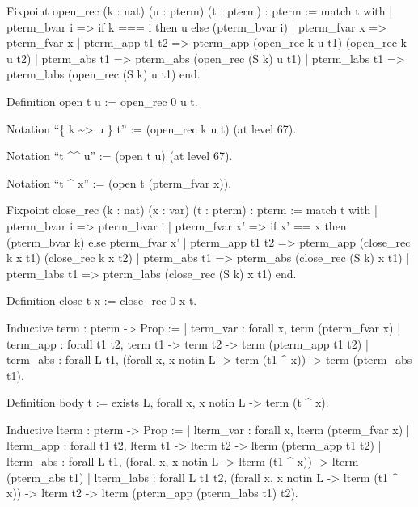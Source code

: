 Fixpoint open\_rec (k : nat) (u : pterm) (t : pterm) : pterm :=
  match t with
  | pterm\_bvar i    => if k === i then u else (pterm\_bvar i)
  | pterm\_fvar x    => pterm\_fvar x
  | pterm\_app t1 t2 => pterm\_app (open\_rec k u t1) (open\_rec k u t2)
  | pterm\_abs t1    => pterm\_abs (open\_rec (S k) u t1)
  | pterm\_labs t1    => pterm\_labs (open\_rec (S k) u t1)
  end.






Definition open t u := open\_rec 0 u t.






Notation ``\{ k \~{}> u \} t'' := (open\_rec k u t) (at level 67).






Notation ``t \^{}\^{} u'' := (open t u) (at level 67). 




Notation ``t \^{} x'' := (open t (pterm\_fvar x)).   


Fixpoint close\_rec  (k : nat) (x : var) (t : pterm) : pterm :=
  match t with
  | pterm\_bvar i    => pterm\_bvar i
  | pterm\_fvar x'    => if x' == x then (pterm\_bvar k) else pterm\_fvar x'
  | pterm\_app t1 t2 => pterm\_app (close\_rec k x t1) (close\_rec k x t2)
  | pterm\_abs t1    => pterm\_abs (close\_rec (S k) x t1)
  | pterm\_labs t1 => pterm\_labs (close\_rec (S k) x t1)
  end.


Definition close t x := close\_rec 0 x t.




Inductive term : pterm -> Prop :=
  | term\_var : forall x,
      term (pterm\_fvar x)
  | term\_app : forall t1 t2,
      term t1 -> 
      term t2 -> 
      term (pterm\_app t1 t2)
  | term\_abs : forall L t1,
      (forall x, x notin L -> term (t1 \^{} x)) ->
      term (pterm\_abs t1).






Definition body t :=
  exists L, forall x, x notin L -> term (t \^{} x).








Inductive lterm : pterm -> Prop :=
  | lterm\_var : forall x,
      lterm (pterm\_fvar x)
  | lterm\_app : forall t1 t2,
      lterm t1 -> 
      lterm t2 -> 
      lterm (pterm\_app t1 t2)
  | lterm\_abs : forall L t1,
      (forall x, x notin L -> lterm (t1 \^{} x)) ->
      lterm (pterm\_abs t1)
  | lterm\_labs : forall L t1 t2,
      (forall x, x notin L -> lterm (t1 \^{} x)) ->
      lterm t2 ->
      lterm (pterm\_app (pterm\_labs t1) t2).




